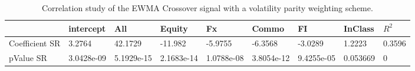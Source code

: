 \begin{table}[H]
\centering
\begin{tabular}{lllllllll}
\hline& intercept & All & Equity & Fx & Commo & FI & InClass & $R^{2}$ \\ 
\hline 
Coefficient SR & 3.2764 & 42.1729 & -11.982 & -5.9755 & -6.3568 & -3.0289 & 1.2223 & 0.3596 \\ 
pValue SR & 3.0428e-09 & 5.1929e-15 & 2.1683e-14 & 1.0788e-08 & 3.8054e-12 & 9.4255e-05 & 0.053669 & 0 \\ 
\hline
\end{tabular}
\caption{Correlation study of the EWMA Crossover signal with a volatility parity weighting scheme.}
\label{MBBSVPNR_CORR}
\end{table}